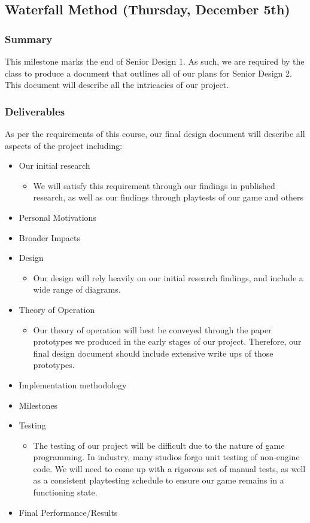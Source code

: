\subsection{Waterfall Method (Thursday, December 5th)}

\subsubsection*{Summary}
This milestone marks the end of Senior Design 1. As such, we are required by the
class to produce a document that outlines all of our plans for Senior Design 2.
This document will describe all the intricacies of our project.

\subsubsection*{Deliverables}
As per the requirements of this course, our final design document will describe
all aspects of the project including:
\begin{itemize}
  \item Our initial research
  \begin{itemize}
    \item We will satisfy this requirement through our findings in published
    research, as well as our findings through playtests of our game and others
  \end{itemize}
  \item Personal Motivations
  \item Broader Impacts
  \item Design
  \begin{itemize}
    \item Our design will rely heavily on our initial research findings, and
    include a wide range of diagrams.
  \end{itemize}
  \item Theory of Operation
  \begin{itemize}
    \item Our theory of operation will best be conveyed through the paper
    prototypes we produced in the early stages of our project. Therefore, our
    final design document should include extensive write ups of those prototypes.
  \end{itemize}
 \item Implementation methodology
 \item Milestones
 \item Testing
 \begin{itemize}
   \item The testing of our project will be difficult due to the nature of game
   programming. In industry, many studios forgo unit testing of non-engine code.
   We will need to come up with a rigorous set of manual tests, as well as a
   consistent playtesting schedule to ensure our game remains in a functioning
   state.
 \end{itemize}
 \item Final Performance/Results
\end{itemize}

